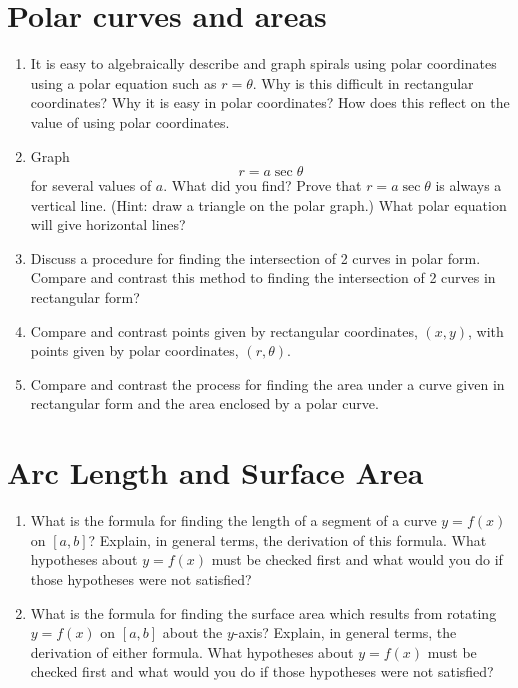 \begin{enumerate}
\end{enumerate}\section{Polar curves and areas}\begin{enumerate}

\item  It is easy to algebraically describe and graph spirals using polar coordinates using a polar equation such as $r=\theta$.  Why is this difficult in rectangular coordinates?  Why it is easy in polar coordinates?  How does this reflect on the value of using polar coordinates.

\item  Graph $$r = a\sec \theta $$  for several values of $a$.  What did you find?  Prove that $r=a\sec\theta$ is always a vertical line.  (Hint:  draw a triangle on the polar graph.)   What polar equation will give horizontal lines?  \cite{FWG}

\item  Discuss a procedure for finding the intersection of 2 curves in polar form.  \cite{SBS}  Compare and contrast this method to finding the intersection of 2 curves in rectangular form?

\item  Compare and contrast points given by rectangular coordinates, $(x,y)$, with points given by polar coordinates, $(r, \theta)$.

\item  Compare and contrast the process for finding the area under a curve given in rectangular form and the area enclosed by a polar curve.


\end{enumerate}\section{Arc Length and Surface Area}\begin{enumerate}

\item  What is the formula for finding the length of a segment of a curve $y = f(x)$ on $[a, b]$?  Explain, in general terms, the derivation of this formula.  What hypotheses about $y=f(x)$ must be checked first and what would you do if those hypotheses were not satisfied?


\item  What is the formula for finding the surface area which results from rotating $y = f(x)$ on 
$[a, b]$ about the $y$-axis?  Explain, in general terms, the derivation of either formula.  What hypotheses about $y=f(x)$ must be checked first and what would you do if those hypotheses were not satisfied?


\end{enumerate}
